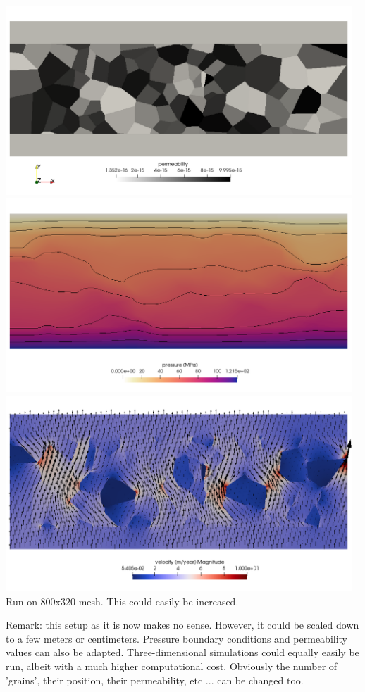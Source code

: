 \begin{center}
\includegraphics[width=13cm]{python_codes/fieldstone_128/results/experiment3/K}\\
\includegraphics[width=13cm]{python_codes/fieldstone_128/results/experiment3/press}\\
\includegraphics[width=13cm]{python_codes/fieldstone_128/results/experiment3/vel}\\
{\captionfont Run on 800x320 mesh. This could easily be increased.} 
\end{center}

Remark: this setup as it is now makes no sense. However, it could be scaled down to a few meters or
centimeters. Pressure boundary conditions and permeability values can also be adapted.
Three-dimensional simulations could equally easily be run, albeit with a much higher
computational cost. 
Obviously the number of 'grains', their position, their permeability, etc ... can be 
changed too.


